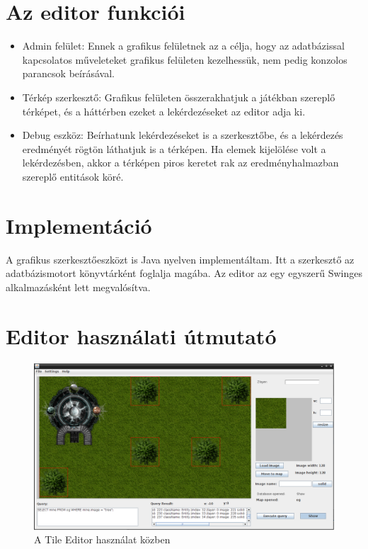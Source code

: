 
\section{Az editor funkciói}

\begin{itemize}
\item Admin felület: Ennek a grafikus felületnek az a célja, hogy az
adatbázissal kapcsolatos műveleteket grafikus felületen kezelhessük, nem pedig konzolos parancsok beírásával.
\item Térkép szerkesztő: Grafikus felületen összerakhatjuk a játékban szereplő térképet, és a háttérben ezeket a lekérdezéseket az editor adja ki.
\item Debug eszköz: Beírhatunk lekérdezéseket is a szerkesztőbe, és a lekérdezés eredményét rögtön láthatjuk is a térképen. Ha elemek kijelölése volt a lekérdezésben, akkor a térképen piros keretet rak az eredményhalmazban szereplő entitások köré.
	
\end{itemize}

\section{Implementáció}

A grafikus szerkesztőeszközt is Java nyelven implementáltam. Itt a szerkesztő az adatbázismotort könyvtárként foglalja magába. Az editor az egy egyszerű Swinges alkalmazásként lett megvalósítva. 

\section{Editor használati útmutató}

\begin{figure}[htb]
	\begin{center}
		\includegraphics[scale=0.3]{images/editor}
		\caption{A Tile Editor használat közben}
		\label{fig:editor}
	\end{center}
\end{figure}

